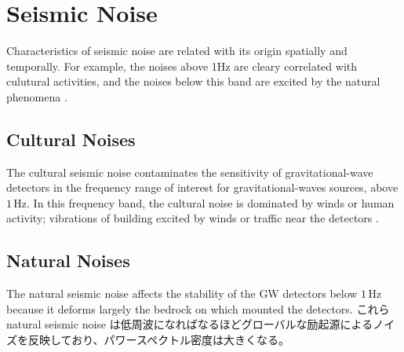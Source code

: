\newpage
\section{Seismic Noise}\label{sec:31}
Characteristics of seismic noise are related with its origin spatially and temporally. For example, the noises above 1Hz are cleary correlated with culutural activities, and the noises below this band are excited by the natural phenomena \cite{bonnefoy2006nature}. 
\subsection{Cultural Noises} \label{sec:311}
The cultural seismic noise contaminates the sensitivity of gravitational-wave detectors in the frequency range of interest for gravitational-waves sources, above $1\,\mathrm{Hz}$. In this frequency band, the cultural noise is dominated by winds or human activity; vibrations of building excited by winds\cite{schofield2000source} or traffic near the detectors \cite{acernese2004properties}. 

\subsection{Natural Noises} \label{sec:312}
The natural seismic noise affects the stability of the GW detectors below $1\,\mathrm{Hz}$ because it deforms largely the bedrock on which mounted the detectors. これらnatural seismic noise は低周波になればなるほどグローバルな励起源によるノイズを反映しており、パワースペクトル密度は大きくなる。

